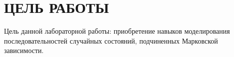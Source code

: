 \section{ЦЕЛЬ РАБОТЫ}

Цель данной лабораторной работы:
приобретение навыков моделирования последовательностей случайных состояний,
подчиненных Марковской зависимости.
